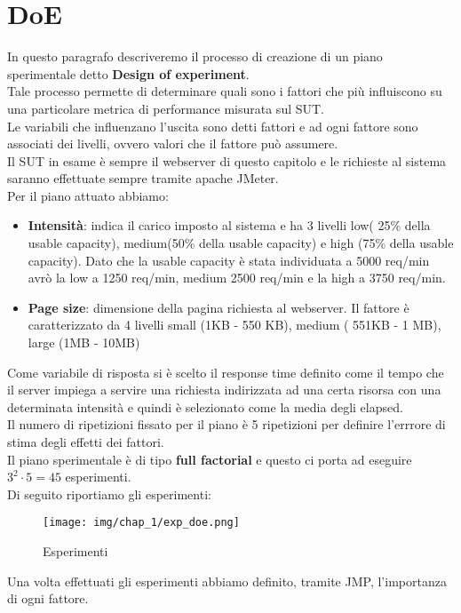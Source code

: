 \section{DoE}
In questo paragrafo descriveremo il processo di creazione di un piano sperimentale detto \textbf{Design of experiment}.\\
Tale processo permette di determinare quali sono i fattori che più influiscono su una particolare metrica di performance misurata sul SUT.\\
Le variabili che influenzano l'uscita sono detti fattori e ad ogni fattore sono associati dei livelli, ovvero valori che il fattore può assumere.\\
Il SUT in esame è sempre il webserver di questo capitolo e le richieste al sistema saranno effettuate sempre tramite apache JMeter.\\
Per il piano attuato abbiamo:
\begin{itemize}
    \item \textbf{Intensità}: indica il carico imposto al sistema e ha 3 livelli low( 25\% della usable capacity), medium(50\% della usable capacity) e high (75\% della usable capacity).
    Dato che la usable capacity è stata individuata a 5000 req/min avrò la low a 1250 req/min, medium 2500 req/min e la high a 3750 req/min.

    \item \textbf{Page size}: dimensione della pagina richiesta al webserver. Il fattore è caratterizzato da 4 livelli small (1KB - 550 KB), medium ( 551KB - 1 MB), large (1MB - 10MB)  
\end{itemize}
Come variabile di risposta si è scelto il response time definito come il tempo che il server impiega a servire una richiesta indirizzata ad una certa risorsa con una determinata intensità e quindi è selezionato come la media degli elapsed.\\
Il numero di ripetizioni fissato per il piano è 5 ripetizioni per definire l'errrore di stima degli effetti dei fattori.\\
Il piano sperimentale è di tipo \textbf{full factorial} e questo ci porta ad eseguire $3^2 \cdot 5 = 45$ esperimenti.\\
Di seguito riportiamo gli esperimenti:
\begin{figure}[H]
    \centering
    \texttt{[image: img/chap\_1/exp\_doe.png]}
    \caption{Esperimenti}
    \label{fig:exp_doe}
\end{figure}
\noindent
Una volta effettuati gli esperimenti abbiamo definito, tramite JMP, l'importanza di ogni fattore.\\
